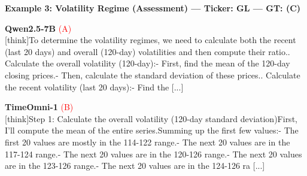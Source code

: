\vspace{8pt}


\noindent
\textbf{Example 3: Volatility Regime (Assessment) --- Ticker: GL --- GT: (C)}
\vspace{2pt}

\noindent
\begin{minipage}[t]{0.28\textwidth}
\colorbox{red!8}{\parbox{\dimexpr\textwidth-2\fboxsep}{
\textbf{Qwen2.5-7B} \textcolor{red}{(A)} \\[2pt]
\tiny
[think]\newline To determine the volatility regimes, we need to calculate both the recent (last 20 days) and overall (120-day) volatilities and then compute their ratio.. Calculate the overall volatility (120-day):\newline    - First, find the mean of the 120-day closing prices.\newline    - Then, calculate the standard deviation of these prices.. Calculate the recent volatility (last 20 days):\newline    - Find the  [...]
}}
\end{minipage}
\hfill
\begin{minipage}[t]{0.28\textwidth}
\colorbox{red!8}{\parbox{\dimexpr\textwidth-2\fboxsep}{
\textbf{TimeOmni-1} \textcolor{red}{(B)} \\[2pt]
\tiny
[think]\newline Step 1: Calculate the overall volatility (120-day standard deviation)\newline First, I'll compute the mean of the entire series.\newline Summing up the first few values:\newline - The first 20 values are mostly in the 114-122 range.\newline - The next 20 values are in the 117-124 range.\newline - The next 20 values are in the 120-126 range.\newline - The next 20 values are in the 123-126 range.\newline - The next 20 values are in the 124-126 ra [...]
}}
\end{minipage}
\hfill
